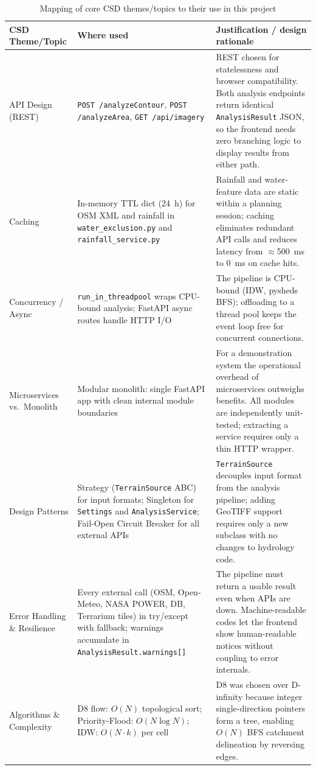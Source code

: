 \documentclass[manuscript,screen,review,nonacm]{acmart}
\begin{document}
\begin{table}[t]
  \caption{Mapping of core CSD themes/topics to their use in this project}
  \label{tab:csd-themes}
  \begin{tabular}{p{2.8cm}p{5.2cm}p{6.5cm}}
    \toprule
    CSD Theme/Topic & Where used & Justification / design rationale \\
    \midrule
    API Design (REST) & \texttt{POST /analyzeContour}, \texttt{POST /analyzeArea}, \texttt{GET /api/imagery} & REST chosen for statelessness and browser compatibility. Both analysis endpoints return identical \texttt{AnalysisResult} JSON, so the frontend needs zero branching logic to display results from either path. \\
    Caching & In-memory TTL dict (24~h) for OSM XML and rainfall in \texttt{water\_exclusion.py} and \texttt{rainfall\_service.py} & Rainfall and water-feature data are static within a planning session; caching eliminates redundant API calls and reduces latency from $\approx$500~ms to 0~ms on cache hits. \\
    Concurrency / Async & \texttt{run\_in\_threadpool} wraps CPU-bound analysis; FastAPI async routes handle HTTP I/O & The pipeline is CPU-bound (IDW, pysheds BFS); offloading to a thread pool keeps the event loop free for concurrent connections. \\
    Microservices vs.\ Monolith & Modular monolith: single FastAPI app with clean internal module boundaries & For a demonstration system the operational overhead of microservices outweighs benefits. All modules are independently unit-tested; extracting a service requires only a thin HTTP wrapper. \\
    Design Patterns & Strategy (\texttt{TerrainSource} ABC) for input formats; Singleton for \texttt{Settings} and \texttt{AnalysisService}; Fail-Open Circuit Breaker for all external APIs & \texttt{TerrainSource} decouples input format from the analysis pipeline; adding GeoTIFF support requires only a new subclass with no changes to hydrology code. \\
    Error Handling \& Resilience & Every external call (OSM, Open-Meteo, NASA POWER, DB, Terrarium tiles) in try/except with fallback; warnings accumulate in \texttt{AnalysisResult.warnings[]} & The pipeline must return a usable result even when APIs are down. Machine-readable codes let the frontend show human-readable notices without coupling to error internals. \\
    Algorithms \& Complexity & D8 flow: $O(N)$ topological sort; Priority-Flood: $O(N \log N)$; IDW: $O(N \cdot k)$ per cell & D8 was chosen over D-infinity because integer single-direction pointers form a tree, enabling $O(N)$ BFS catchment delineation by reversing edges. \\

\end{tabular}
\end{table}
\end{document}
